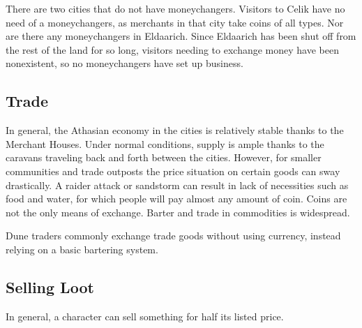There are two cities that do not have moneychangers. Visitors to Celik have no need of a moneychangers, as merchants in that city take coins of all types. Nor are there any moneychangers in Eldaarich. Since Eldaarich has been shut off from the rest of the land for so long, visitors needing to exchange money have been nonexistent, so no moneychangers have set up business.

\subsection{Trade}
In general, the Athasian economy in the cities is relatively stable thanks to the Merchant Houses. Under normal conditions, supply is ample thanks to the caravans traveling back and forth between the cities. However, for smaller communities and trade outposts the price situation on certain goods can sway drastically. A raider attack or sandstorm can result in lack of necessities such as food and water, for which people will pay almost any amount of coin. Coins are not the only means of exchange. Barter and trade in commodities is widespread.

Dune traders commonly exchange trade goods without using currency, instead relying on a basic bartering system.



\subsection{Selling Loot}
In general, a character can sell something for half its listed price.

